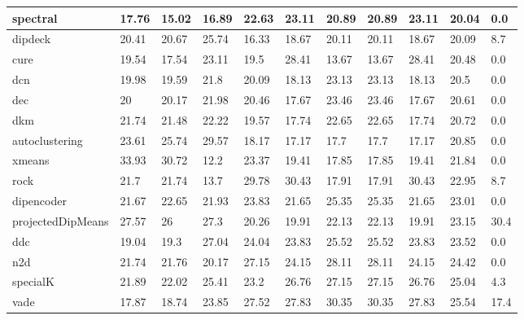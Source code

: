 \begin{table}[H]
\begin{tabular}{|l|l|l|l|l|l|l|l|l|l|l|}
spectral & 17.76 & 15.02 & 16.89 & 22.63 & 23.11 & 20.89 & 20.89 & 23.11 & 20.04 & 0.0%
\\\hline
dipdeck & 20.41 & 20.67 & 25.74 & 16.33 & 18.67 & 20.11 & 20.11 & 18.67 & 20.09 & 8.7%
\\\hline
cure & 19.54 & 17.54 & 23.11 & 19.5 & 28.41 & 13.67 & 13.67 & 28.41 & 20.48 & 0.0%
\\\hline
dcn & 19.98 & 19.59 & 21.8 & 20.09 & 18.13 & 23.13 & 23.13 & 18.13 & 20.5 & 0.0%
\\\hline
dec & 20 & 20.17 & 21.98 & 20.46 & 17.67 & 23.46 & 23.46 & 17.67 & 20.61 & 0.0%
\\\hline
dkm & 21.74 & 21.48 & 22.22 & 19.57 & 17.74 & 22.65 & 22.65 & 17.74 & 20.72 & 0.0%
\\\hline
autoclustering & 23.61 & 25.74 & 29.57 & 18.17 & 17.17 & 17.7 & 17.7 & 17.17 & 20.85 & 0.0%
\\\hline
xmeans & 33.93 & 30.72 & 12.2 & 23.37 & 19.41 & 17.85 & 17.85 & 19.41 & 21.84 & 0.0%
\\\hline
rock & 21.7 & 21.74 & 13.7 & 29.78 & 30.43 & 17.91 & 17.91 & 30.43 & 22.95 & 8.7%
\\\hline
dipencoder & 21.67 & 22.65 & 21.93 & 23.83 & 21.65 & 25.35 & 25.35 & 21.65 & 23.01 & 0.0%
\\\hline
projectedDipMeans & 27.57 & 26 & 27.3 & 20.26 & 19.91 & 22.13 & 22.13 & 19.91 & 23.15 & 30.4%
\\\hline
ddc & 19.04 & 19.3 & 27.04 & 24.04 & 23.83 & 25.52 & 25.52 & 23.83 & 23.52 & 0.0%
\\\hline
n2d & 21.74 & 21.76 & 20.17 & 27.15 & 24.15 & 28.11 & 28.11 & 24.15 & 24.42 & 0.0%
\\\hline
specialK & 21.89 & 22.02 & 25.41 & 23.2 & 26.76 & 27.15 & 27.15 & 26.76 & 25.04 & 4.3%
\\\hline
vade & 17.87 & 18.74 & 23.85 & 27.52 & 27.83 & 30.35 & 30.35 & 27.83 & 25.54 & 17.4%

\end{tabular}
\end{table}
